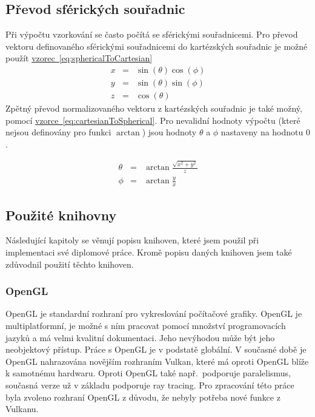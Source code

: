 \documentclass[czech,master]{diploma}
\begin{document}
\subsection{Převod sférických souřadnic}
Při výpočtu vzorkování se často počítá se sférickými souřadnicemi. Pro převod vektoru definovaného sférickými souřadnicemi do kartézských souřadnic je možné použít \hyperref[eq:sphericalToCartesian]{vzorec~\ref{eq:sphericalToCartesian}}
\begin{eqnarray}
  x & = & \sin(\theta)\cos(\phi)\nonumber \\
  y & = & \sin(\theta)\sin(\phi)\nonumber \\
  z & = & \cos(\theta)\label{eq:sphericalToCartesian}
\end{eqnarray}
Zpětný převod normalizovaného vektoru z kartézských souřadnic je také možný, pomocí \hyperref[eq:cartesianToSpherical]{vzorce~\ref{eq:cartesianToSpherical}}. Pro nevalidní hodnoty výpočtu (které nejsou definovány pro funkci \(\arctan\)) jsou hodnoty \(\theta\) a \(\phi\) nastaveny na hodnotu \(0\).

\begin{eqnarray}
  \theta & = & \arctan \frac{\sqrt{x^2 + y^2}}{z} \nonumber \\
  \phi & = & \arctan \frac{y}{x}\label{eq:cartesianToSpherical}
\end{eqnarray}

\subsection{Použité knihovny}
Následující kapitoly se věnují popisu knihoven, které jsem použil při implementaci své diplomové práce. Kromě popisu daných knihoven jsem také zdůvodnil použití těchto knihoven.

\subsubsection{OpenGL}
OpenGL je standardní rozhraní pro vykreslování počítačové grafiky. OpenGL je multiplatformní, je možné s ním pracovat pomocí množství programovacích jazyků a má velmi kvalitní dokumentaci. Jeho nevýhodou může být jeho neobjektový přístup. Práce s OpenGL je v podstatě globální. V současné době je OpenGL nahrazována novějším rozhraním Vulkan, které má oproti OpenGL blíže k samotnému hardwaru. Oproti OpenGL také např.\ podporuje paralelismus, současná verze už v základu podporuje ray tracing. Pro zpracování této práce byla zvoleno rozhraní OpenGL z důvodu, že nebyly potřeba nové funkce z Vulkanu.
\end{document}
